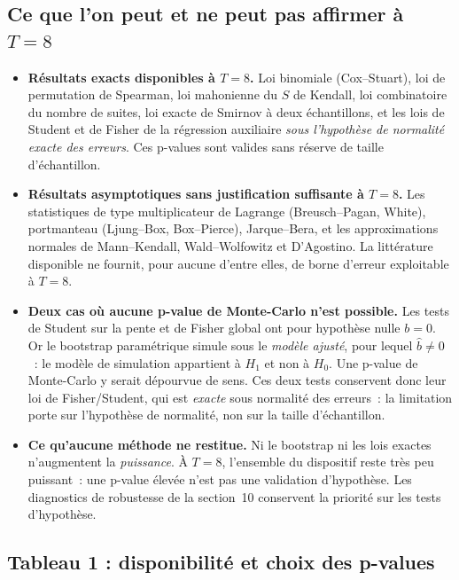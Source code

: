 \documentclass[a4paper,11pt]{article}
\begin{document}
\subsection{Ce que l'on peut et ne peut pas affirmer à $T = 8$}

\begin{itemize}[itemsep=3pt]
  \item \textbf{Résultats exacts disponibles à $T = 8$.} Loi binomiale
  (Cox--Stuart), loi de permutation de Spearman, loi mahonienne du $S$ de
  Kendall, loi combinatoire du nombre de suites, loi exacte de Smirnov à deux
  échantillons, et les lois de Student et de Fisher de la régression auxiliaire
  \emph{sous l'hypothèse de normalité exacte des erreurs}. Ces p-values sont
  valides sans réserve de taille d'échantillon.
  \item \textbf{Résultats asymptotiques sans justification suffisante à
  $T = 8$.} Les statistiques de type multiplicateur de Lagrange
  (Breusch--Pagan, White), portmanteau (Ljung--Box, Box--Pierce),
  Jarque--Bera, et les approximations normales de Mann--Kendall,
  Wald--Wolfowitz et D'Agostino. La littérature disponible ne fournit, pour
  aucune d'entre elles, de borne d'erreur exploitable à $T = 8$.
  \item \textbf{Deux cas où aucune p-value de Monte-Carlo n'est possible.} Les
  tests de Student sur la pente et de Fisher global ont pour hypothèse nulle
  $b = 0$. Or le bootstrap paramétrique simule sous le \emph{modèle ajusté},
  pour lequel $\hat b \neq 0$~: le modèle de simulation appartient à $H_1$ et
  non à $H_0$. Une p-value de Monte-Carlo y serait dépourvue de sens. Ces deux
  tests conservent donc leur loi de Fisher/Student, qui est \emph{exacte} sous
  normalité des erreurs~: la limitation porte sur l'hypothèse de normalité, non
  sur la taille d'échantillon.
  \item \textbf{Ce qu'aucune méthode ne restitue.} Ni le bootstrap ni les lois
  exactes n'augmentent la \emph{puissance}. À $T = 8$, l'ensemble du dispositif
  reste très peu puissant~: une p-value élevée n'est pas une validation
  d'hypothèse. Les diagnostics de robustesse de la section~10 conservent la
  priorité sur les tests d'hypothèse.
\end{itemize}

\newpage
\subsection{Tableau 1 : disponibilité et choix des p-values}
\label{tab:nature}
\end{document}
